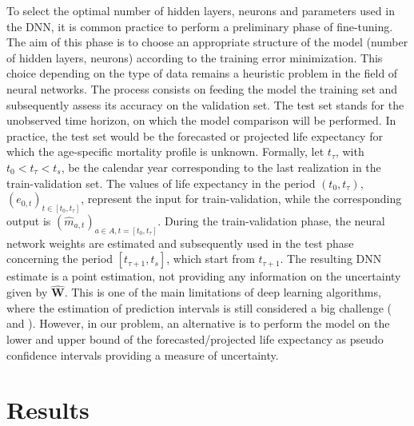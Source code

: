 \documentclass[a4,11pt]{article}
\begin{document}
To select the optimal number of hidden layers, neurons and parameters used in the DNN, it is common practice to perform a preliminary phase of fine-tuning. The aim of this phase is to choose an appropriate structure of the model (number of hidden layers, neurons) according to the training error minimization. This choice depending on the type of data remains a heuristic problem in the field of neural networks. The process consists on feeding the model the training set and subsequently assess its accuracy on the validation set. The test set stands for the unobserved time horizon, on which the model comparison will be performed. In practice, the test set would be the forecasted or projected life expectancy for which the age-specific mortality profile is unknown. Formally, let $t_{\tau}$, with $t_0<t_{\tau}<t_s$, be the calendar year corresponding to the last realization in the train-validation set. The values of life expectancy in the period $(t_0,t_{\tau})$, $(e_{0,t})_{t\in [t_{0},t_{\tau}]}$, represent the input for train-validation, while the corresponding output is $(\hat{m}_{a,t})_{a\in A,t=[t_{0},t_{\tau}]}$. During the train-validation phase, the neural network weights are estimated and subsequently used in the test phase concerning the period $[t_{\tau+1},t_{s}]$, which start from $t_{\tau+1}$. The resulting DNN estimate is a point estimation, not providing any information on the uncertainty given by $\hat{\mathbf{W}}$. This is one of the main limitations of deep learning algorithms, where the estimation of prediction intervals is still considered a big challenge (\cite{Khosravi} and \cite{Keren}). However, in our problem, an alternative is to perform the model on the lower and upper bound of the forecasted/projected life expectancy as pseudo confidence intervals providing a measure of uncertainty.  

\section{Results}
\end{document}
